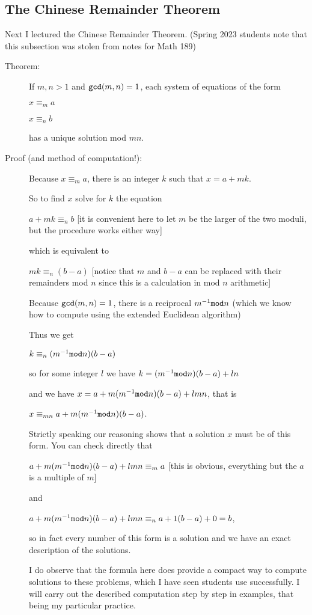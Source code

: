 \documentclass[12pt]{article}
\begin{document}
\subsection{The Chinese Remainder Theorem}

Next I lectured the Chinese Remainder Theorem.   (Spring 2023 students note that this subsection was stolen from notes for Math 189)

\begin{description}

\item[Theorem:]  If $m,n >1$ and ${\tt gcd}(m,n)=1$, each system of equations of the form

$x\equiv_m a$

$x \equiv_n b$

has a unique solution mod $mn$.

\item[Proof (and method of computation!):]  Because $x \equiv_m a$, there is an integer $k$ such that
$x = a+mk$.

So to find $x$ solve for $k$ the equation 

 $a+mk \equiv_n b$  [it is convenient here to let $m$ be the larger of the two moduli, but the procedure works either way]

which is equivalent to

$mk \equiv_n (b-a)$  [notice that $m$ and $b-a$ can be replaced with their remainders mod $n$ since this is a calculation in mod $n$ arithmetic]

Because ${\tt gcd}(m,n)=1$, there is a reciprocal $m^{-1} {\tt mod} n$ (which we know how to compute using the extended Euclidean algorithm)

Thus we get

$k \equiv_n (m^{-1} {\tt mod} n)(b-a)$

so for some integer $l$ we have $k=(m^{-1} {\tt mod} n)(b-a) + ln$

and we have $x = a + m(m^{-1} {\tt mod} n)(b-a) + lmn$, that is

$x \equiv_{mn} a + m(m^{-1} {\tt mod} n)(b-a)$.

Strictly speaking our reasoning shows that a solution $x$ must be of this form.  You can check directly that

$a + m(m^{-1} {\tt mod} n)(b-a) + lmn \equiv_m a$ [this is obvious, everything but the $a$ is a multiple of $m$]

and

$a +m(m^{-1}{\tt mod} n)(b-a) + lmn \equiv_n a + 1(b-a) + 0 = b$,

so in fact every number of this form is a solution and we have an exact description of the solutions.

I do observe that the formula here does provide a compact way to compute solutions to these problems, which I have seen students use successfully.  I will carry out the described computation step by step in examples, that being my particular practice.


\end{description}
\end{document}

